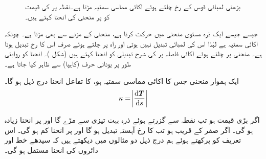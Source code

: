 \begin{figure}
\begin{minipage}{0.45\textwidth}
\end{minipage}\hfill
\begin{minipage}{0.45\textwidth}
\centering
{}
\caption{بڑھتی لمبائی قوس کے رخ چلتے ہوئے اکائی مماسی سمتیہ  مڑتا ہے۔نقطہ  پر  کی قیمت کو  پر منحنی کی انحنا کہتے ہیں۔}
\label{شکل_سمتی_تفاعل_ریل_گاڑی}
\end{minipage}
\end{figure}

جیسے جیسے ایک ذرہ مستوی منحنی  میں حرکت کرتا ہے، منحنی کے مڑنے سے   بھی مڑتا ہے۔ چونکہ  اکائی سمتیہ ہے لہٰذا اس کی لمبائی تبدیل نہیں ہوتی  اور راہ پر چلتے ہوئے  صرف اس کا رخ تبدیل ہوتا ہے۔ منحنی پر چلتے ہوئے اکائی فاصلہ پر    کی شرح تبدیلی کو انحنا کہتے ہیں (شکل )۔ انحنا کو روایتی طور پر یونانی حرف   (کاہپا) سے ظاہر کیا جاتا ہے۔

 ایک  ہموار منحنی جس  کا اکائی مماسی سمتیہ   ہو، کا تفاعل انحنا درج ذیل ہو گا۔
\begin{align*}
\kappa=\abs{\frac{\dif \kvec{T}}{\dif s}}
\end{align*}

اگر  بڑی قیمت ہو تب نقطہ  سے گزرتے ہوئے ذرہ بہت تیزی سے مڑے گا اور  پر انحنا زیادہ ہو گی۔ اگر  صفر کے قریب ہو تب  کا رخ آہستہ تبدیل ہو گا اور  پر انحنا کم ہو گی۔ اس تعریف کو  پرکھتے ہوئے  ہم درج ذیل دو مثالوں میں دیکھتے ہیں کہ سیدھے خط اور دائروں کی انحنا  مستقل ہو گی۔

